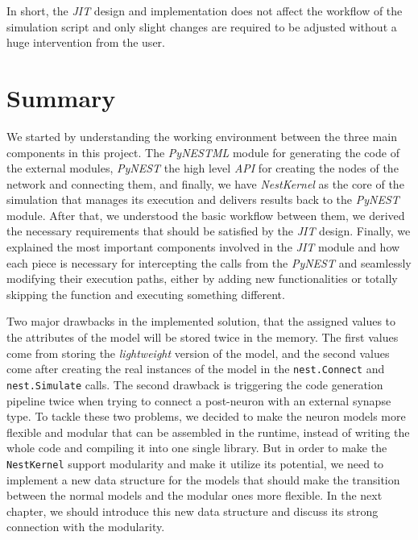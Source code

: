 In short, the \emph{JIT} design and implementation does not affect the workflow of the simulation script and only slight changes are required to be adjusted without a huge intervention from the user.

\section{Summary}

We started by understanding the working environment between the three main components in this project. The \emph{PyNESTML} module for generating the code of the external modules, \emph{PyNEST} the high level \emph{API} for creating the nodes of the network and connecting them, and finally, we  have \emph{NestKernel} as the core of the simulation that manages its execution and delivers results back to the \emph{PyNEST} module. After that, we understood the basic workflow between them, we derived the necessary requirements that should be satisfied by the \emph{JIT} design. Finally, we explained the most important components involved in the \emph{JIT} module and how each piece is necessary for intercepting the calls from the \emph{PyNEST} and seamlessly modifying their execution paths, either by adding new functionalities or totally skipping the function and executing something different.


Two major drawbacks in the implemented solution, that the assigned values to the attributes of the model will be stored twice in the memory. The first values come from storing the \emph{lightweight} version of the model, and the second values come after creating the real instances of the model in the \texttt{nest.Connect} and \texttt{nest.Simulate} calls. The second drawback is triggering the code generation pipeline twice when trying to connect a post-neuron with an external synapse type. To tackle these two problems, we decided to make the neuron models more flexible and modular that can be assembled in the runtime, instead of writing the whole code and compiling it into one single library. But in order to make the \texttt{NestKernel} support modularity and make it utilize its potential, we need to implement a new data structure for the models that should make the transition between the normal models and the modular ones more flexible. In the next chapter, we should introduce this new data structure and discuss its strong connection with the modularity.

